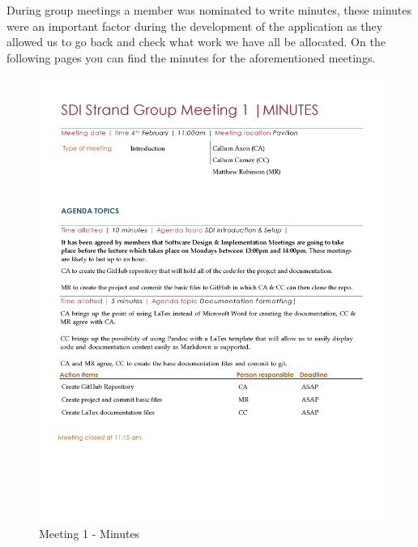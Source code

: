 \documentclass[
  english,
  a4paper,
,tablecaptionabove
]{scrartcl}
\begin{document}
During group meetings a member was nominated to write minutes, these
minutes were an important factor during the development of the
application as they allowed us to go back and check what work we have
all be allocated. On the following pages you can find the minutes for
the aforementioned meetings.

\begin{figure}
\centering
\includegraphics{images/meeting-minutes/meeting-1.png}
\caption{Meeting 1 - Minutes}
\end{figure}
\end{document}
